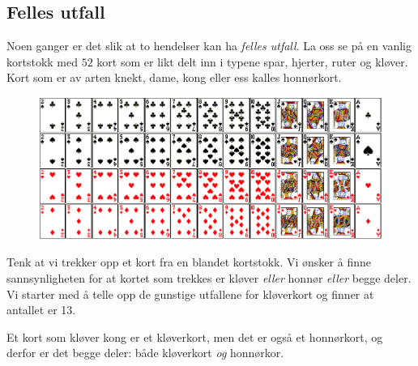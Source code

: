 \subsection{Felles utfall}	
	Noen ganger er det slik at to hendelser kan ha \textit{felles utfall}. La oss se på en vanlig kortstokk med $52$ kort som er likt delt inn i typene spar, hjerter, ruter og kløver.  Kort som er av arten knekt, dame, kong eller ess kalles honnørkort.	
	\begin{figure}[H]
		\centering
		\includegraphics[scale=0.45]{kort}
	\end{figure}  

\parbox[l][][l]{0.5\linewidth}{Tenk at vi trekker opp et kort fra en blandet kortstokk. 
	Vi ønsker å finne sannsynligheten for at kortet som trekkes 
	er kløver \textsl{eller} honnør \textsl{eller} begge deler.
	Vi starter med å telle opp de gunstige utfallene for kløverkort og finner at antallet er 13.}\qquad
\parbox[r][][l]{0.4\linewidth}{\begin{shaded}%
		Et kort som kløver kong er et kløverkort, men det er også et honnørkort, og derfor er det begge deler: både kløverkort \textsl{og} honnørkor.\end{shaded}}
	
